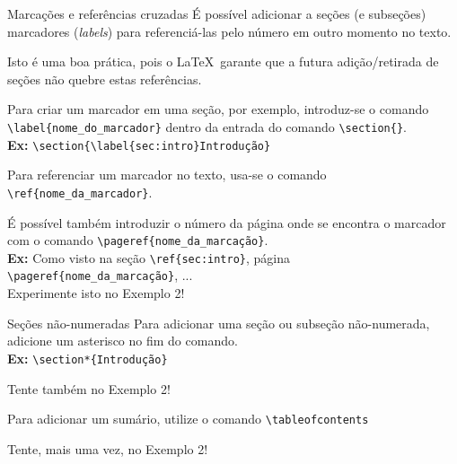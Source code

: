 \documentclass[12pt]{beamer}
\begin{document}
\begin{frame}{Marcações e referências cruzadas}
  É possível adicionar a seções (e subseções) marcadores (\textit{labels}) para referenciá-las pelo número em outro momento no texto.
  
  Isto é uma boa prática, pois o \LaTeX\ garante que a futura adição/retirada de seções não quebre estas referências.

\end{frame}

\begin{frame}[fragile]
  Para criar um marcador em uma seção, por exemplo, introduz-se o comando \verb+\label{nome_do_marcador}+ dentro da entrada do comando \verb+\section{}+.\\
  \bigskip  
  \textbf{Ex:} \verb+\section{\label{sec:intro}Introdução}+
\end{frame}

\begin{frame}[fragile]
  Para referenciar um marcador no texto, usa-se o comando \verb+\ref{nome_da_marcador}+. 
  
  É possível também introduzir o número da página onde se encontra o marcador com o comando \verb+\pageref{nome_da_marcação}+.\\
  \medskip
  \textbf{Ex:} Como visto na seção \verb+\ref{sec:intro}+, página \verb+\pageref{nome_da_marcação}+, ...\\
  \medskip
  Experimente isto no Exemplo 2!
\end{frame}

\begin{frame}[fragile]{Seções não-numeradas}
  Para adicionar uma seção ou subseção não-numerada, adicione um asterisco no fim do comando.\\
  \medskip
  \textbf{Ex:} \verb+\section*{Introdução}+
  \medskip

  Tente também no Exemplo 2!
  
\end{frame}

\begin{frame}[fragile]
  Para adicionar um sumário, utilize o comando \verb+\tableofcontents+
  \bigskip

  Tente, mais uma vez, no Exemplo 2!
\end{frame}
\end{document}
